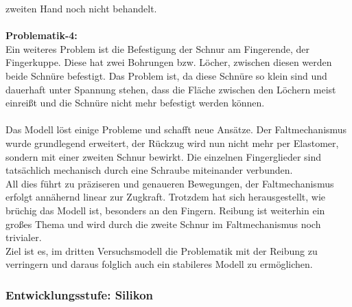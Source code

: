 \documentclass[titlepage,12pt,twoside]{article}
\begin{document}
zweiten Hand noch nicht behandelt. \\
\\
\textbf{Problematik-4: } \\
Ein weiteres Problem ist die Befestigung der Schnur am Fingerende, der Fingerkuppe. Diese hat zwei Bohrungen bzw. Löcher, zwischen diesen werden beide Schnüre befestigt. Das Problem ist, da diese Schnüre so klein sind und dauerhaft 
unter Spannung stehen, dass die Fläche zwischen den Löchern meist einreißt und die Schnüre nicht mehr befestigt werden können. \\
\\
Das Modell löst einige Probleme und schafft neue Ansätze. Der Faltmechanismus wurde grundlegend erweitert, der Rückzug wird nun nicht mehr per Elastomer, sondern mit einer zweiten Schnur bewirkt.
Die einzelnen Fingerglieder sind tatsächlich mechanisch durch eine Schraube miteinander verbunden. \\
All dies führt zu präziseren und genaueren Bewegungen, der Faltmechanismus erfolgt annähernd linear zur Zugkraft. Trotzdem hat sich herausgestellt, wie brüchig das Modell ist, besonders an den Fingern. Reibung ist weiterhin ein großes Thema und 
wird durch die zweite Schnur im Faltmechanismus noch trivialer. \\
Ziel ist es, im dritten Versuchsmodell die Problematik mit der Reibung zu verringern und daraus folglich auch ein stabileres Modell zu ermöglichen.\\

\subsubsection{Entwicklungsstufe: Silikon}
\label{chap:Entwicklungsstufe: Silikon}
\end{document}

